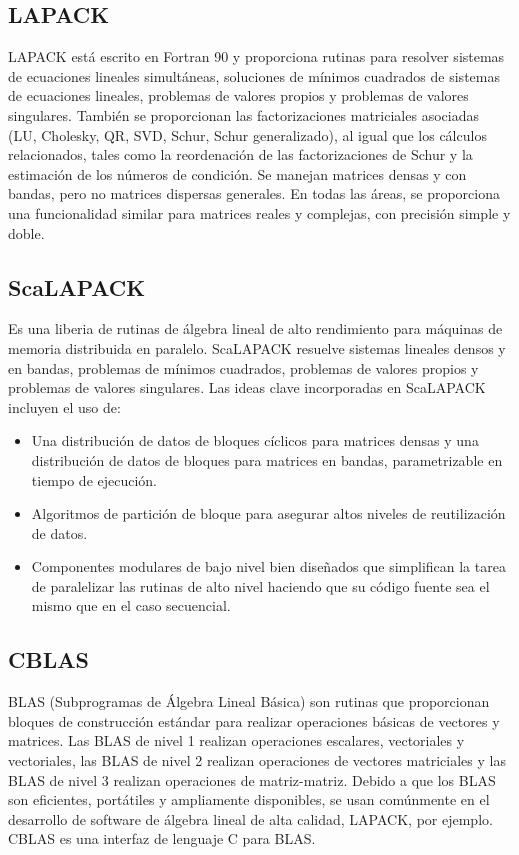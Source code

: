 \subsection{LAPACK}
    LAPACK está escrito en Fortran 90 y proporciona rutinas para resolver
    sistemas de ecuaciones lineales simultáneas, soluciones de mínimos
    cuadrados de sistemas de ecuaciones lineales, problemas de valores propios y
    problemas de valores singulares. También se proporcionan las factorizaciones
    matriciales asociadas (LU, Cholesky, QR, SVD, Schur, Schur generalizado),
    al igual que los cálculos relacionados, tales como la reordenación de las
    factorizaciones de Schur y la estimación de los números de condición. Se
    manejan matrices densas y con bandas, pero no matrices dispersas generales.
    En todas las áreas, se proporciona una funcionalidad similar para matrices
    reales y complejas, con precisión simple y doble.

\subsection{ScaLAPACK}
    Es una liberia de rutinas de álgebra lineal de alto rendimiento para máquinas
    de memoria distribuida en paralelo. ScaLAPACK resuelve sistemas lineales
    densos y en bandas, problemas de mínimos cuadrados, problemas de valores
    propios y problemas de valores singulares. Las ideas clave incorporadas en
    ScaLAPACK incluyen el uso de:
    \begin{itemize}
        \item Una distribución de datos de bloques cíclicos para matrices densas
        y una distribución de datos de bloques para matrices en bandas,
        parametrizable en tiempo de ejecución.
        \item Algoritmos de partición de bloque para asegurar altos niveles de
        reutilización de datos.
        \item Componentes modulares de bajo nivel bien diseñados que simplifican
        la tarea de paralelizar las rutinas de alto nivel haciendo que su código
        fuente sea el mismo que en el caso secuencial.
    \end{itemize}

\subsection{CBLAS}
    BLAS (Subprogramas de Álgebra Lineal Básica) son rutinas que proporcionan
    bloques de construcción estándar para realizar operaciones básicas de
    vectores y matrices. Las BLAS de nivel 1 realizan operaciones escalares,
    vectoriales y vectoriales, las BLAS de nivel 2 realizan operaciones de
    vectores matriciales y las BLAS de nivel 3 realizan operaciones
    de matriz-matriz. Debido a que los BLAS son eficientes, portátiles y
    ampliamente disponibles, se usan comúnmente en el desarrollo de software
    de álgebra lineal de alta calidad, LAPACK, por ejemplo.\\
    CBLAS es una interfaz de lenguaje C para BLAS.
